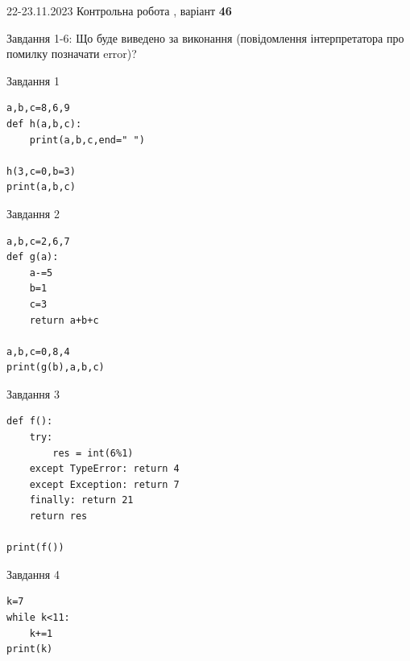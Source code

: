 \documentclass[12pt, ukrainian]{article}
\begin{document}
{{22-23.11.2023 Контрольна робота , варіант  \No \textbf { 46 }\par}}
{

Завдання 1-6: Що буде виведено за виконання (повідомлення інтерпретатора про помилку позначати error)?


\begin{minipage}[t]{9.7cm}                
{\begin{center}Завдання {1}\end{center}}
\begin{verbatim}
a,b,c=8,6,9
def h(a,b,c):
    print(a,b,c,end=" ")

h(3,c=0,b=3)
print(a,b,c)
\end{verbatim}     
\end{minipage}
\vline \hspace{8mm}
\begin{minipage}[t]{8.0cm}                
{\begin{center}Завдання {2}\end{center}}
\begin{verbatim}
a,b,c=2,6,7
def g(a):
    a-=5
    b=1
    c=3
    return a+b+c

a,b,c=0,8,4
print(g(b),a,b,c)
\end{verbatim}     
\end{minipage}

\vspace{15mm}
\begin{minipage}[t]{9.7cm}                
{\begin{center}Завдання {3}\end{center}}
\begin{verbatim}
def f():
    try:
        res = int(6%1)
    except TypeError: return 4
    except Exception: return 7
    finally: return 21
    return res

print(f())
\end{verbatim}     
\end{minipage}
\vline \hspace{8mm}
\begin{minipage}[t]{8.0cm}                
{\begin{center}Завдання {4}\end{center}}
\begin{verbatim}
k=7
while k<11:
    k+=1
print(k)
\end{verbatim}     
\end{minipage}

}
\end{document}
